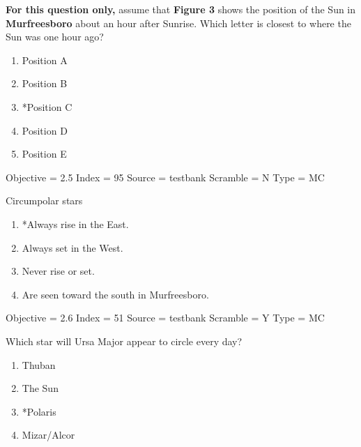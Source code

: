 \documentclass[11pt]{article}
\begin{document}
\begin{enumerate}
\begin{minipage}{\textwidth}
\begin{minipage}{\textwidth}
\item {\bf For this question only,} assume that {\bf Figure 3} shows the position of the Sun in {\bf Murfreesboro} about an hour after Sunrise.   Which letter is closest to where the Sun was one hour ago?
\begin{multicols}{3}
\begin{enumerate} 
\setlength{\itemsep}{1pt} 
\setlength{\parskip}{0pt} 
\setlength{\parsep}{0pt}
\setlength{\multicolsep}{1pt} 
\item Position A
\item Position B
\item *Position C
\item Position D
\item Position E
\end{enumerate} 
\vfill 
\end{multicols}

Objective = 2.5
Index = 95
Source = testbank
Scramble = N
Type = MC
\end{minipage}
\end{minipage}
\vskip 0.20in

\begin{minipage}{\textwidth}
\begin{minipage}{\textwidth}
\item Circumpolar stars
\begin{enumerate} 
\setlength{\itemsep}{1pt} 
\setlength{\parskip}{0pt} 
\setlength{\parsep}{0pt}
\setlength{\multicolsep}{1pt} 
\item *Always rise in the East.
\item Always set in the West.
\item Never rise or set.
\item Are seen toward the south in Murfreesboro.
\end{enumerate} 
Objective = 2.6
Index = 51
Source = testbank
Scramble = Y
Type = MC
\end{minipage}
\end{minipage}
\vskip 0.20in

\begin{minipage}{\textwidth}
\begin{minipage}{\textwidth}
\item Which star will Ursa Major appear to circle every day?
\begin{multicols}{3}
\begin{enumerate} 
\setlength{\itemsep}{1pt} 
\setlength{\parskip}{0pt} 
\setlength{\parsep}{0pt}
\setlength{\multicolsep}{1pt} 
\item Thuban
\item The Sun
\item *Polaris
\item Mizar/Alcor
\end{enumerate} 
\vfill 
\end{multicols}


\end{minipage}
\end{minipage}
\end{enumerate}
\end{document}
